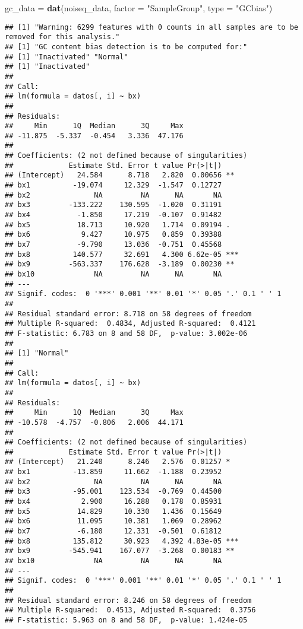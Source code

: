 \documentclass[]{article}
\newenvironment{Shaded}{\begin{snugshade}}{\end{snugshade}}
\newcommand{\KeywordTok}[1]{\textcolor[rgb]{0.13,0.29,0.53}{\textbf{#1}}}
\newcommand{\DataTypeTok}[1]{\textcolor[rgb]{0.13,0.29,0.53}{#1}}
\newcommand{\StringTok}[1]{\textcolor[rgb]{0.31,0.60,0.02}{#1}}
\newcommand{\NormalTok}[1]{#1}
\begin{document}
\begin{Shaded}
\begin{Highlighting}[]
\NormalTok{gc_data =}\StringTok{ }\KeywordTok{dat}\NormalTok{(noiseq_data, }\DataTypeTok{factor =} \StringTok{"SampleGroup"}\NormalTok{, }\DataTypeTok{type =} \StringTok{"GCbias"}\NormalTok{)}
\end{Highlighting}
\end{Shaded}

\begin{verbatim}
## [1] "Warning: 6299 features with 0 counts in all samples are to be removed for this analysis."
## [1] "GC content bias detection is to be computed for:"
## [1] "Inactivated" "Normal"     
## [1] "Inactivated"
## 
## Call:
## lm(formula = datos[, i] ~ bx)
## 
## Residuals:
##     Min      1Q  Median      3Q     Max 
## -11.875  -5.337  -0.454   3.336  47.176 
## 
## Coefficients: (2 not defined because of singularities)
##             Estimate Std. Error t value Pr(>|t|)    
## (Intercept)   24.584      8.718   2.820  0.00656 ** 
## bx1          -19.074     12.329  -1.547  0.12727    
## bx2               NA         NA      NA       NA    
## bx3         -133.222    130.595  -1.020  0.31191    
## bx4           -1.850     17.219  -0.107  0.91482    
## bx5           18.713     10.920   1.714  0.09194 .  
## bx6            9.427     10.975   0.859  0.39388    
## bx7           -9.790     13.036  -0.751  0.45568    
## bx8          140.577     32.691   4.300 6.62e-05 ***
## bx9         -563.337    176.628  -3.189  0.00230 ** 
## bx10              NA         NA      NA       NA    
## ---
## Signif. codes:  0 '***' 0.001 '**' 0.01 '*' 0.05 '.' 0.1 ' ' 1
## 
## Residual standard error: 8.718 on 58 degrees of freedom
## Multiple R-squared:  0.4834, Adjusted R-squared:  0.4121 
## F-statistic: 6.783 on 8 and 58 DF,  p-value: 3.002e-06
## 
## [1] "Normal"
## 
## Call:
## lm(formula = datos[, i] ~ bx)
## 
## Residuals:
##     Min      1Q  Median      3Q     Max 
## -10.578  -4.757  -0.806   2.006  44.171 
## 
## Coefficients: (2 not defined because of singularities)
##             Estimate Std. Error t value Pr(>|t|)    
## (Intercept)   21.240      8.246   2.576  0.01257 *  
## bx1          -13.859     11.662  -1.188  0.23952    
## bx2               NA         NA      NA       NA    
## bx3          -95.001    123.534  -0.769  0.44500    
## bx4            2.900     16.288   0.178  0.85931    
## bx5           14.829     10.330   1.436  0.15649    
## bx6           11.095     10.381   1.069  0.28962    
## bx7           -6.180     12.331  -0.501  0.61812    
## bx8          135.812     30.923   4.392 4.83e-05 ***
## bx9         -545.941    167.077  -3.268  0.00183 ** 
## bx10              NA         NA      NA       NA    
## ---
## Signif. codes:  0 '***' 0.001 '**' 0.01 '*' 0.05 '.' 0.1 ' ' 1
## 
## Residual standard error: 8.246 on 58 degrees of freedom
## Multiple R-squared:  0.4513, Adjusted R-squared:  0.3756 
## F-statistic: 5.963 on 8 and 58 DF,  p-value: 1.424e-05
\end{verbatim}
\end{document}
